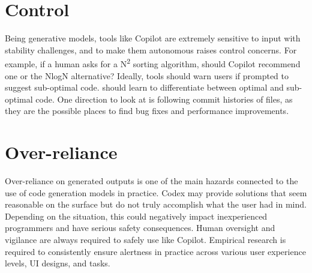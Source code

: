 \section{Control}
\label{control}
Being generative models, tools like Copilot are extremely sensitive to input with stability challenges, and to make them autonomous raises control concerns.
For example, if a human asks for a N\textsuperscript{2} sorting algorithm, should Copilot recommend one or the NlogN alternative? 
Ideally, tools should warn users if prompted to suggest sub-optimal code. 
\AISE{} should learn to differentiate between optimal and sub-optimal code. 
One direction to look at is following commit histories of files, as they are the possible places to find bug fixes and performance improvements.

\section{Over-reliance}
Over-reliance on generated outputs is one of the main hazards connected to the use of code generation models in practice.
Codex may provide solutions that seem reasonable on the surface but do not truly accomplish what the user had in mind. Depending on the situation, this could negatively impact inexperienced programmers and have serious safety consequences. Human oversight and vigilance are always required to safely use \cct{} like Copilot.
Empirical research is required to consistently ensure alertness in practice across various user experience levels, UI designs, and tasks.